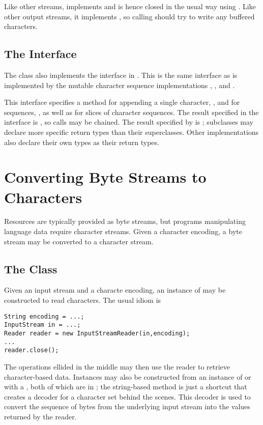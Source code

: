 Like other streams,  implements  and is
hence closed in the usual way using .  Like other output
streams, it implements , so calling 
should try to write any buffered characters.

\subsection{The  Interface}

The  class also implements the 
interface in .  This is the same interface as is
implemented by the mutable character sequence implementations
, , and .

This interface specifies a method for appending a single character,
, and for sequences, ,
as well as for slices of character sequences.  The result specified in
the  interface is , so calls may be
chained.  The result specified by  is ;
subclasses may declare more specific return types than their
superclasses.  Other implementations also declare their own types
as their return types.


\section{Converting Byte Streams to Characters}

Resources are typically provided as byte streams, but programs
manipulating language data require character streams.  Given a
character encoding, a byte stream may be converted to a character
stream. 

\subsection{The  Class}\label{section:io-inputstreamreader}

Given an input stream and a characte encoding, an instance
of  may be constructed to read characters.
The usual idiom is
%
\begin{verbatim}
String encoding = ...;
InputStream in = ...;
Reader reader = new InputStreamReader(in,encoding);
...
reader.close();
\end{verbatim}
%
The operations ellided in the middle may then use the reader to
retrieve character-based data.  Instances may also be constructed from
an instance of  or with a , both of
which are in ; the string-based method is just
a shortcut that creates a decoder for a character set behind the
scenes.  This decoder is used to convert the sequence of bytes from
the underlying input stream into the  values returned by
the reader.

